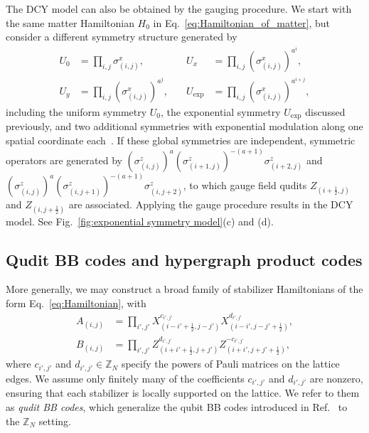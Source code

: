 \documentclass[aps,prb,english,superscriptaddress,twocolumn,tightenlines,showpacs,longbibliography,floatfix,amsfonts]{revtex4-2}
\begin{document}
The DCY model can also be obtained by the gauging procedure. We start with the same matter Hamiltonian $H_0$ in Eq.~\eqref{eq:Hamiltonian_of_matter}, but consider a different symmetry structure generated by
\begin{equation}
\begin{array}{rlrl}
U_0 &= \prod_{i,j} \sigma_{(i,j)}^x, & \quad
U_x &= \prod_{i,j} (\sigma_{(i,j)}^x)^{a^i}, \\
U_y &= \prod_{i,j} (\sigma_{(i,j)}^x)^{a^j}, & \quad
U_{\mathrm{exp}} &= \prod_{i,j} (\sigma_{(i,j)}^x)^{a^{i+j}},
\end{array} \label{eq:sym_DCY}
\end{equation}
including the uniform symmetry $U_0$,  the exponential symmetry $U_{\operatorname{exp}}$ discussed previously, and two additional symmetries with exponential modulation along one spatial coordinate each~\cite{note}.
If these global symmetries are independent, 
symmetric operators are generated by $(\sigma_{(i,j)}^{z})^{a}(\sigma_{(i+1,j)}^{z})^{-(a+1)}\sigma_{(i+2,j)}^{z}$ and $(\sigma_{(i,j)}^{z})^{a}(\sigma_{(i,j+1)}^{z})^{-(a+1)}\sigma_{(i,j+2)}^{z}$, to which gauge field qudits $Z_{(i+\frac{1}{2},j)}$ and $Z_{(i,j+\frac{1}{2})}$ are associated. 
Applying the gauge procedure results in the DCY model. See Fig.~\ref{fig:exponential symmetry model}(c) and (d).

\subsection{Qudit BB codes and hypergraph product codes\label{sec2c}}

More generally, we may construct a broad family of stabilizer Hamiltonians of the form Eq.~\eqref{eq:Hamiltonian}, with
\begin{equation}
    \begin{aligned}
    A_{(i,j)}&= \prod_{i',j'}X^{c_{i',j'}}_{(i-i'+\frac{1}{2},j-j')}X^{d_{i',j'}}_{(i-i',j-j'+\frac{1}{2})}, \\
    B_{(i,j)}&= \prod_{i',j'}Z^{d_{i',j'}}_{(i+i'+\frac{1}{2},j+j')}Z^{-c_{i',j'}}_{(i+i',j+j'+\frac{1}{2})}, 
\end{aligned}\label{eq:stabilizers_of_BB_code_model}
\end{equation}
where $c_{i',j'}$ and $d_{i',j'}\in\mathbb{Z}_N$ specify the powers of Pauli matrices on the lattice edges. We assume only finitely many of the coefficients $c_{i',j'}$ and $d_{i',j'}$ are nonzero, ensuring that each stabilizer is locally supported on the lattice. We refer to them as \textit{qudit BB codes}, which generalize the qubit BB codes introduced in Ref.~\cite{Bravyi2024} to the $\mathbb{Z}_N$ setting.
  
\end{document}
